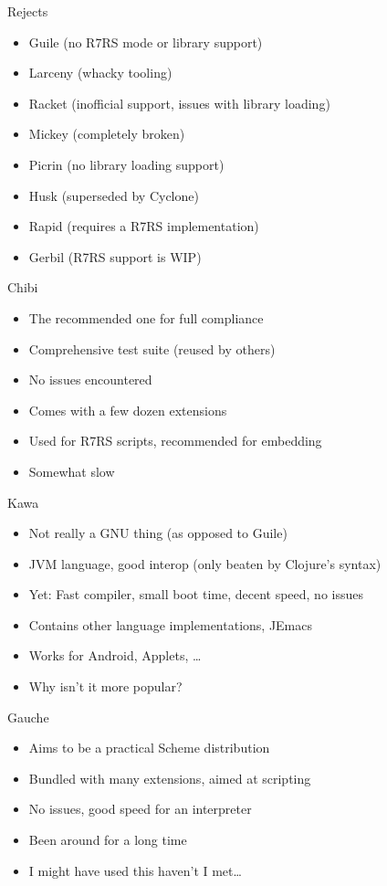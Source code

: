 \documentclass[presentation]{beamer}
\begin{document}
\begin{frame}[label=sec-3-4]{Rejects}
\begin{itemize}
\item Guile (no R7RS mode or library support)
\item Larceny (whacky tooling)
\item Racket (inofficial support, issues with library loading)
\item Mickey (completely broken)
\item Picrin (no library loading support)
\item Husk (superseded by Cyclone)
\item Rapid (requires a R7RS implementation)
\item Gerbil (R7RS support is WIP)
\end{itemize}
\end{frame}

\begin{frame}[label=sec-3-5]{Chibi}
\begin{itemize}
\item The recommended one for full compliance
\item Comprehensive test suite (reused by others)
\item No issues encountered
\item Comes with a few dozen extensions
\item Used for R7RS scripts, recommended for embedding
\item Somewhat slow
\end{itemize}
\end{frame}

\begin{frame}[label=sec-3-6]{Kawa}
\begin{itemize}
\item Not really a GNU thing (as opposed to Guile)
\item JVM language, good interop (only beaten by Clojure's syntax)
\item Yet: Fast compiler, small boot time, decent speed, no issues
\item Contains other language implementations, JEmacs
\item Works for Android, Applets, \ldots{}
\item Why isn't it more popular?
\end{itemize}
\end{frame}

\begin{frame}[label=sec-3-7]{Gauche}
\begin{itemize}
\item Aims to be a practical Scheme distribution
\item Bundled with many extensions, aimed at scripting
\item No issues, good speed for an interpreter
\item Been around for a long time
\item I might have used this haven't I met\ldots{}
\end{itemize}
\end{frame}
\end{document}
